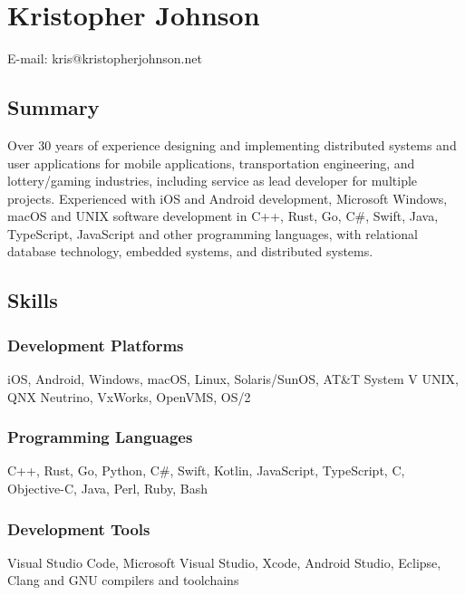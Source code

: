 \section{Kristopher Johnson}\label{kristopher-johnson}

E-mail: kris@kristopherjohnson.net

\subsection{Summary}\label{summary}

Over 30 years of experience designing and implementing distributed
systems and user applications for mobile applications, transportation
engineering, and lottery/gaming industries, including service as lead
developer for multiple projects. Experienced with iOS and Android
development, Microsoft Windows, macOS and UNIX software development in
C++, Rust, Go, C\#, Swift, Java, TypeScript, JavaScript and other
programming languages, with relational database technology, embedded
systems, and distributed systems.

\subsection{Skills}\label{skills}

\subsubsection{Development Platforms}\label{development-platforms}

iOS, Android, Windows, macOS, Linux, Solaris/SunOS, AT\&T System V UNIX,
QNX Neutrino, VxWorks, OpenVMS, OS/2

\subsubsection{Programming Languages}\label{programming-languages}

C++, Rust, Go, Python, C\#, Swift, Kotlin, JavaScript, TypeScript, C,
Objective-C, Java, Perl, Ruby, Bash

\subsubsection{Development Tools}\label{development-tools}

Visual Studio Code, Microsoft Visual Studio, Xcode, Android Studio,
Eclipse, Clang and GNU compilers and toolchains

